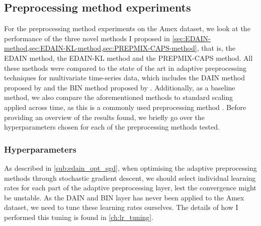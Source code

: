 \documentclass{statsmsc}
\begin{document}
{%

\subsection{Preprocessing method experiments}%
\label{sub:amex_res}

For the preprocessing method experiments on the Amex dataset, we look at the performance of
the three novel methods I proposed in \cref{sec:EDAIN-method,sec:EDAIN-KL-method,sec:PREPMIX-CAPS-method}, that is, the \ac{EDAIN} method, the \ac{EDAIN-KL} method and the \ac{PREPMIX-CAPS} method.
All these methods were compared to the state of the art in adaptive preprocessing techniques
for multivariate time-series data, which includes the \ac{DAIN} method proposed
by \cite{dain} and the
\ac{BIN} method proposed by \cite{bin}. Additionally, as a baseline method, we also compare the
aforementioned methods to standard scaling applied across time, as this is a commonly used
preprocessing method \citep{singh,nawi,stanislav}.
Before providing an overview of the results found, we briefly go over the
hyperparameters chosen for each of the preprocessing methods tested.

\subsubsection{Hyperparameters}%
\label{ssub:Learning rate tuning}

As described in \cref{sub:edain_opt_sgd}, when optimising the adaptive preprocessing methods
through stochastic gradient descent, we should select individual learning rates for each part
of the adaptive preprocessing layer, lest the convergence might be unstable.
As the \ac{DAIN} and \ac{BIN} layer has never been applied to the Amex dataset, we need
to tune these learning rates ourselves. The details of how I performed this tuning is found in
\cref{ch:lr_tuning}.

}
\end{document}
